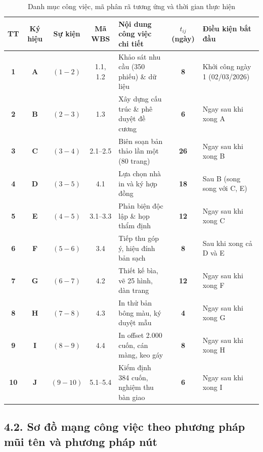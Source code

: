 \begin{table}[htbp]
\centering
\caption{Danh mục công việc, mã phân rã tương ứng và thời gian thực hiện}
\label{tab:danh_muc_cong_viec}
\begin{tabularx}{\textwidth}{cCCCYcL}
\toprule
\textbf{TT} & \textbf{Ký hiệu} & \textbf{Sự kiện} & \textbf{Mã WBS} & \textbf{Nội dung công việc chi tiết} & \textbf{$t_{ij}$ (ngày)} & \textbf{Điều kiện bắt đầu} \\
\midrule
\textbf{1} & \textbf{A} & $(1 - 2)$ & 1.1, 1.2 & Khảo sát nhu cầu (350 phiếu) \& dữ liệu & \textbf{8} & Khởi công ngày 1 (02/03/2026) \\
\textbf{2} & \textbf{B} & $(2 - 3)$ & 1.3 & Xây dựng cấu trúc \& phê duyệt đề cương & \textbf{6} & Ngay sau khi xong A \\
\textbf{3} & \textbf{C} & $(3 - 4)$ & 2.1--2.5 & Biên soạn bản thảo lần một (80 trang) & \textbf{26} & Ngay sau khi xong B \\
\textbf{4} & \textbf{D} & $(3 - 5)$ & 4.1 & Lựa chọn nhà in và ký hợp đồng & \textbf{18} & Sau B (song song với C, E) \\
\textbf{5} & \textbf{E} & $(4 - 5)$ & 3.1--3.3 & Phản biện độc lập \& họp thẩm định & \textbf{12} & Ngay sau khi xong C \\
\textbf{6} & \textbf{F} & $(5 - 6)$ & 3.4 & Tiếp thu góp ý, hiệu đính bản sạch & \textbf{8} & Sau khi xong cả D và E \\
\textbf{7} & \textbf{G} & $(6 - 7)$ & 4.2 & Thiết kế bìa, vẽ 25 hình, dàn trang & \textbf{12} & Ngay sau khi xong F \\
\textbf{8} & \textbf{H} & $(7 - 8)$ & 4.3 & In thử bản bông màu, ký duyệt mẫu & \textbf{4} & Ngay sau khi xong G \\
\textbf{9} & \textbf{I} & $(8 - 9)$ & 4.4 & In offset 2.000 cuốn, cán màng, keo gáy & \textbf{8} & Ngay sau khi xong H \\
\textbf{10} & \textbf{J} & $(9 - 10)$ & 5.1--5.4 & Kiểm định 384 cuốn, nghiệm thu bàn giao & \textbf{6} & Ngay sau khi xong I \\
\bottomrule
\end{tabularx}
\end{table}

\subsection*{4.2. Sơ đồ mạng công việc theo phương pháp mũi tên và phương pháp nút}

